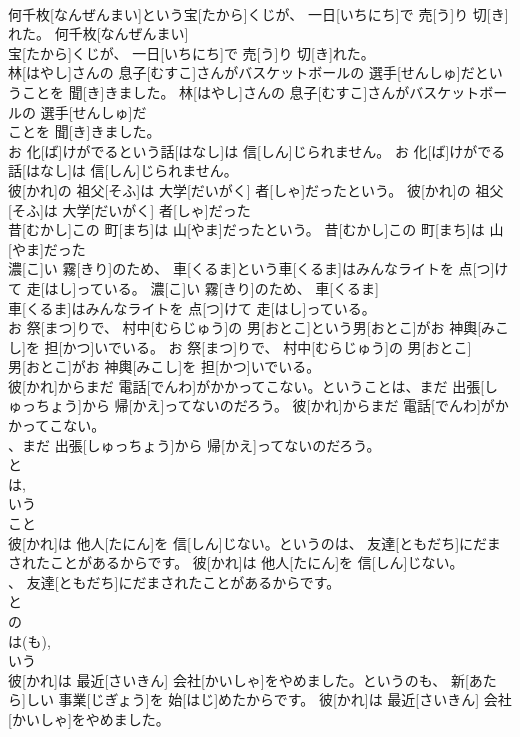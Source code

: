 \documentclass[8pt]{extreport}
\begin{document}
\begin{CJK}{UTF8}{min}
\\	何千枚[なんぜんまい]という宝[たから]くじが、 一日[いちにち]で 売[う]り 切[き]れた。	何千枚[なんぜんまい]
\\	宝[たから]くじが、 一日[いちにち]で 売[う]り 切[き]れた。	
\\	林[はやし]さんの 息子[むすこ]さんがバスケットボールの 選手[せんしゅ]だということを 聞[き]きました。	林[はやし]さんの 息子[むすこ]さんがバスケットボールの 選手[せんしゅ]だ
\\	ことを 聞[き]きました。	
\\	お 化[ば]けがでるという話[はなし]は 信[しん]じられません。	お 化[ば]けがでる
\\	話[はなし]は 信[しん]じられません。	
\\	彼[かれ]の 祖父[そふ]は 大学[だいがく] 者[しゃ]だったという。	彼[かれ]の 祖父[そふ]は 大学[だいがく] 者[しゃ]だった
\\	昔[むかし]この 町[まち]は 山[やま]だったという。	昔[むかし]この 町[まち]は 山[やま]だった
\\	濃[こ]い 霧[きり]のため、 車[くるま]という車[くるま]はみんなライトを 点[つ]けて 走[はし]っている。	濃[こ]い 霧[きり]のため、 車[くるま]
\\	車[くるま]はみんなライトを 点[つ]けて 走[はし]っている。	
\\	お 祭[まつ]りで、 村中[むらじゅう]の 男[おとこ]という男[おとこ]がお 神輿[みこし]を 担[かつ]いでいる。	お 祭[まつ]りで、 村中[むらじゅう]の 男[おとこ]
\\	男[おとこ]がお 神輿[みこし]を 担[かつ]いでいる。	
\\	彼[かれ]からまだ 電話[でんわ]がかかってこない。ということは、まだ 出張[しゅっちょう]から 帰[かえ]ってないのだろう。	彼[かれ]からまだ 電話[でんわ]がかかってこない。
\\	、まだ 出張[しゅっちょう]から 帰[かえ]ってないのだろう。	
\\	と 
\\	は, 
\\	いう 
\\	こと
\\	彼[かれ]は 他人[たにん]を 信[しん]じない。というのは、 友達[ともだち]にだまされたことがあるからです。	彼[かれ]は 他人[たにん]を 信[しん]じない。
\\	、 友達[ともだち]にだまされたことがあるからです。	
\\	と 
\\	の 
\\	は(も), 
\\	いう
\\	彼[かれ]は 最近[さいきん] 会社[かいしゃ]をやめました。というのも、 新[あたら]しい 事業[じぎょう]を 始[はじ]めたからです。	彼[かれ]は 最近[さいきん] 会社[かいしゃ]をやめました。

\end{CJK}
\end{document}
